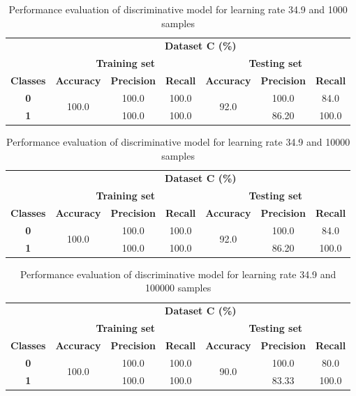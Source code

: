 \documentclass{article}
\begin{document}
  \begin{table}[h]
  \centering
  \caption{Performance evaluation of discriminative model for learning rate 34.9 and 1000 samples} \label{tab:13}
  \begin{tabular}{ccccccc}
  \cline{2-7}
  & \multicolumn{6}{c}{\textbf{Dataset C (\%)}} \\ \cline{2-7}
  & \multicolumn{3}{c}{\textbf{Training set}} & \multicolumn{3}{c}{\textbf{Testing set}} \\ \hline
  \textbf{Classes} & \textbf{Accuracy} & \textbf{Precision} & \textbf{Recall} & \textbf{Accuracy} & \textbf{Precision} & \textbf{Recall} \\ \hline
  \textbf{0} & \multirow{2}{*}{100.0} & 100.0 & 100.0 & \multirow{2}{*}{92.0} & 100.0 & 84.0 \\ \cline{1-1} \cline{3-4} \cline{6-7} 
  \textbf{1} &  & 100.0 & 100.0 &  & 86.20 & 100.0 \\ \hline
  \end{tabular}
  \end{table}
  
  \begin{table}[h]
  \centering
  \caption{Performance evaluation of discriminative model for learning rate 34.9 and 10000 samples} \label{tab:14}
  \begin{tabular}{ccccccc}
  \cline{2-7}
  & \multicolumn{6}{c}{\textbf{Dataset C (\%)}} \\ \cline{2-7}
  & \multicolumn{3}{c}{\textbf{Training set}} & \multicolumn{3}{c}{\textbf{Testing set}} \\ \hline
  \textbf{Classes} & \textbf{Accuracy} & \textbf{Precision} & \textbf{Recall} & \textbf{Accuracy} & \textbf{Precision} & \textbf{Recall} \\ \hline
  \textbf{0} & \multirow{2}{*}{100.0} & 100.0 & 100.0 & \multirow{2}{*}{92.0} & 100.0 & 84.0 \\ \cline{1-1} \cline{3-4} \cline{6-7} 
  \textbf{1} &  & 100.0 & 100.0 &  & 86.20 & 100.0 \\ \hline
  \end{tabular}
  \end{table}
  
  \begin{table}[h]
  \centering
  \caption{Performance evaluation of discriminative model for learning rate 34.9 and 100000 samples} \label{tab:15}
  \begin{tabular}{ccccccc}
  \cline{2-7}
  & \multicolumn{6}{c}{\textbf{Dataset C (\%)}} \\ \cline{2-7}
  & \multicolumn{3}{c}{\textbf{Training set}} & \multicolumn{3}{c}{\textbf{Testing set}} \\ \hline
  \textbf{Classes} & \textbf{Accuracy} & \textbf{Precision} & \textbf{Recall} & \textbf{Accuracy} & \textbf{Precision} & \textbf{Recall} \\ \hline
  \textbf{0} & \multirow{2}{*}{100.0} & 100.0 & 100.0 & \multirow{2}{*}{90.0} & 100.0 & 80.0 \\ \cline{1-1} \cline{3-4} \cline{6-7} 
  \textbf{1} &  & 100.0 & 100.0 &  & 83.33 & 100.0 \\ \hline
  \end{tabular}
  \end{table}
\end{document}
